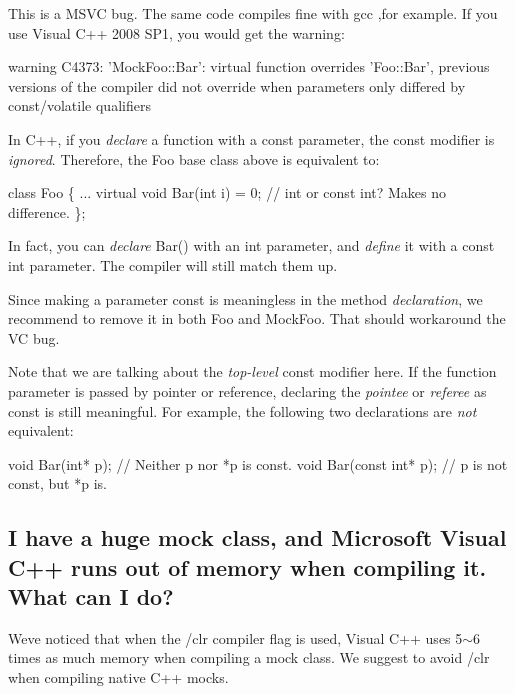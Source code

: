 This is a M\+S\+VC bug. The same code compiles fine with gcc ,for example. If you use Visual C++ 2008 S\+P1, you would get the warning\+: 
\begin{DoxyCode}
warning C4373: 'MockFoo::Bar': virtual function overrides 'Foo::Bar', previous versions of the compiler did
       not override when parameters only differed by const/volatile qualifiers
\end{DoxyCode}


In C++, if you {\itshape declare} a function with a {\ttfamily const} parameter, the {\ttfamily const} modifier is {\itshape ignored}. Therefore, the {\ttfamily Foo} base class above is equivalent to\+: 
\begin{DoxyCode}
\textcolor{keyword}{class }Foo \{
  ...
  \textcolor{keyword}{virtual} \textcolor{keywordtype}{void} Bar(\textcolor{keywordtype}{int} i) = 0;  \textcolor{comment}{// int or const int?  Makes no difference.}
\};
\end{DoxyCode}


In fact, you can {\itshape declare} Bar() with an {\ttfamily int} parameter, and {\itshape define} it with a {\ttfamily const int} parameter. The compiler will still match them up.

Since making a parameter {\ttfamily const} is meaningless in the method {\itshape declaration}, we recommend to remove it in both {\ttfamily Foo} and {\ttfamily Mock\+Foo}. That should workaround the VC bug.

Note that we are talking about the {\itshape top-\/level} {\ttfamily const} modifier here. If the function parameter is passed by pointer or reference, declaring the {\itshape pointee} or {\itshape referee} as {\ttfamily const} is still meaningful. For example, the following two declarations are {\itshape not} equivalent\+: 
\begin{DoxyCode}
\textcolor{keywordtype}{void} Bar(\textcolor{keywordtype}{int}* p);        \textcolor{comment}{// Neither p nor *p is const.}
\textcolor{keywordtype}{void} Bar(\textcolor{keyword}{const} \textcolor{keywordtype}{int}* p);  \textcolor{comment}{// p is not const, but *p is.}
\end{DoxyCode}


\subsection*{I have a huge mock class, and Microsoft Visual C++ runs out of memory when compiling it. What can I do?}

We\textquotesingle{}ve noticed that when the {\ttfamily /clr} compiler flag is used, Visual C++ uses 5$\sim$6 times as much memory when compiling a mock class. We suggest to avoid {\ttfamily /clr} when compiling native C++ mocks.

